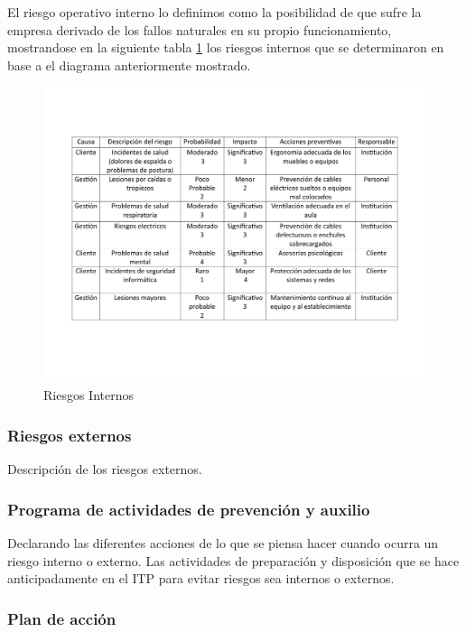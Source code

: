     El riesgo operativo interno lo definimos como la posibilidad de que sufre la empresa derivado de los fallos naturales en su propio funcionamiento, mostrandose en la siguiente tabla \ref{fig:riesgosInternos} los riesgos internos que se determinaron en base a el diagrama anteriormente mostrado.
    \begin{figure}[H]
        \centering
        \includegraphics[scale=0.3]{21/img/tablaRiesgosInternos.pdf}
        \caption{Riesgos Internos}
        \label{fig:riesgosInternos}
    \end{figure}
    
    
    
    \subsubsection{Riesgos externos}
    
    Descripción de los riesgos externos.
    \subsubsection{Programa de actividades de prevención y auxilio}
    
    Declarando las diferentes acciones de lo que se piensa hacer cuando ocurra un riesgo interno o externo. 
    Las actividades de preparación y disposición que se hace anticipadamente en el ITP para evitar riesgos sea internos o externos.
    \subsubsection{Plan de acción}
    
